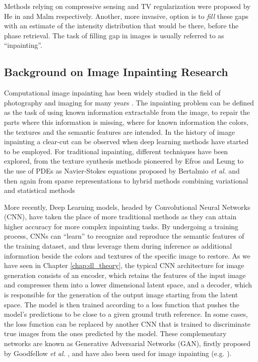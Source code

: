 Methods relying on compressive sensing and TV regularization were proposed by He in \cite{He2015} and Malm 
\cite{Chushkin2025} respectively. Another, more invasive, option is to \textit{fill} these gaps with an estimate of 
the intensity distribution that would be there, before the phase retrieval. The task of filling gap in images is usually 
referred to as ``inpainting''.


\subsection{Background on Image Inpainting Research}
 
Computational image inpainting has been widely studied in the field of photography and imaging for many years \cite{Elharrouss_2019,reviewInpainting2021}. 
The inpainting problem can be defined as the task of using known information extractable from the image, to repair
the parts where this information is missing, where for known information the colors, the textures and the semantic features
are intended. In the history of image inpainting a clear-cut can be observed when deep learning methods have started to be employed.
For traditional inpainting, different techniques have been explored, from the texture synthesis methods pioneered by Efros and 
Leung \cite{Efros1999} to the use of PDEs as Navier-Stokes equations proposed by Bertalmio \textit{et al.} \cite{BertalmioNavierStokes}
and then again from sparse representations \cite{Mairal_sparse} to hybrid methods combining variational and statistical methods \cite{CedricAllene}

More recently, Deep Learning models, headed by Convolutional Neural Networks (CNN), have taken the place of more traditional 
methods as they can attain higher accuracy for more complex inpainting tasks. By undergoing a  
training process, CNNs can ``learn'' to recognize and reproduce the semantic features of the training dataset, and thus
leverage them during inference as additional information beside the colors and textures of the specific image to restore. 
As we have seen in Chapter \ref{chap:dl_theory}, the typical CNN architecture for image generation consists of an encoder, which
retains the features of the input image and compresses them into a lower dimensional latent space, and a decoder, which
is responsible for the generation of the output image starting from the latent space. The model is then trained according 
to a loss function that pushes the model's predictions to be close to a given ground truth reference. 
In some cases, the loss function can be replaced by another CNN that is trained to discriminate true images from the ones
predicted by the model. These complementary networks are known as Generative Adversarial Networks (GAN), firstly 
proposed by Goodfellow \textit{et al.} \cite{goodfellow2014generativeadversarialnetworks}, and have also been used for 
image inpainting (e.g. \cite{gan_inpainting}). 

